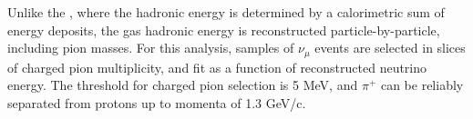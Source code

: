 Unlike the , where the hadronic energy is determined by a calorimetric sum of energy deposits, the gas  hadronic energy is reconstructed particle-by-particle, including pion masses. For this analysis, samples of $\nu_{\mu}$  events are selected in slices of charged pion multiplicity, and fit as a function of reconstructed neutrino energy. The threshold for charged pion selection is 5 MeV, and $\pi^{+}$ can be reliably separated from protons up to momenta of 1.3 GeV/c.


